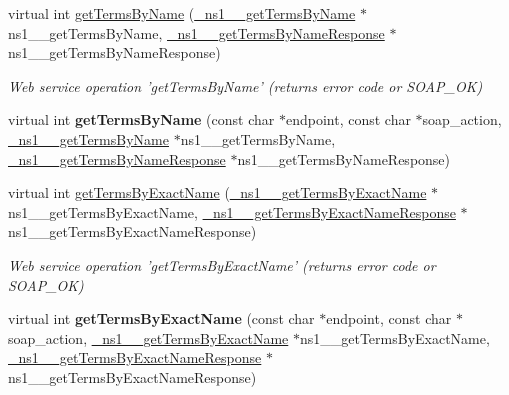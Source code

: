 \begin{DoxyCompactItemize}
\item 
\hypertarget{classOntologyQuerySoapBindingProxy_abed86e0a77e60d35f99a9c21392cc032}{
virtual int \hyperlink{classOntologyQuerySoapBindingProxy_abed86e0a77e60d35f99a9c21392cc032}{getTermsByName} (\hyperlink{class__ns1____getTermsByName}{\_\-ns1\_\-\_\-getTermsByName} $\ast$ns1\_\-\_\-getTermsByName, \hyperlink{class__ns1____getTermsByNameResponse}{\_\-ns1\_\-\_\-getTermsByNameResponse} $\ast$ns1\_\-\_\-getTermsByNameResponse)}
\label{classOntologyQuerySoapBindingProxy_abed86e0a77e60d35f99a9c21392cc032}

\begin{DoxyCompactList}\small\item\em Web service operation 'getTermsByName' (returns error code or SOAP\_\-OK) \end{DoxyCompactList}\item 
\hypertarget{classOntologyQuerySoapBindingProxy_a36ebaeffc771ed225f044237e8254526}{
virtual int {\bfseries getTermsByName} (const char $\ast$endpoint, const char $\ast$soap\_\-action, \hyperlink{class__ns1____getTermsByName}{\_\-ns1\_\-\_\-getTermsByName} $\ast$ns1\_\-\_\-getTermsByName, \hyperlink{class__ns1____getTermsByNameResponse}{\_\-ns1\_\-\_\-getTermsByNameResponse} $\ast$ns1\_\-\_\-getTermsByNameResponse)}
\label{classOntologyQuerySoapBindingProxy_a36ebaeffc771ed225f044237e8254526}

\item 
\hypertarget{classOntologyQuerySoapBindingProxy_a4a574aafb50edd63358192c71394dbbd}{
virtual int \hyperlink{classOntologyQuerySoapBindingProxy_a4a574aafb50edd63358192c71394dbbd}{getTermsByExactName} (\hyperlink{class__ns1____getTermsByExactName}{\_\-ns1\_\-\_\-getTermsByExactName} $\ast$ns1\_\-\_\-getTermsByExactName, \hyperlink{class__ns1____getTermsByExactNameResponse}{\_\-ns1\_\-\_\-getTermsByExactNameResponse} $\ast$ns1\_\-\_\-getTermsByExactNameResponse)}
\label{classOntologyQuerySoapBindingProxy_a4a574aafb50edd63358192c71394dbbd}

\begin{DoxyCompactList}\small\item\em Web service operation 'getTermsByExactName' (returns error code or SOAP\_\-OK) \end{DoxyCompactList}\item 
\hypertarget{classOntologyQuerySoapBindingProxy_a21beb6008812c1caba8d94eb230f9f7d}{
virtual int {\bfseries getTermsByExactName} (const char $\ast$endpoint, const char $\ast$soap\_\-action, \hyperlink{class__ns1____getTermsByExactName}{\_\-ns1\_\-\_\-getTermsByExactName} $\ast$ns1\_\-\_\-getTermsByExactName, \hyperlink{class__ns1____getTermsByExactNameResponse}{\_\-ns1\_\-\_\-getTermsByExactNameResponse} $\ast$ns1\_\-\_\-getTermsByExactNameResponse)}
\label{classOntologyQuerySoapBindingProxy_a21beb6008812c1caba8d94eb230f9f7d}


\end{DoxyCompactItemize}
